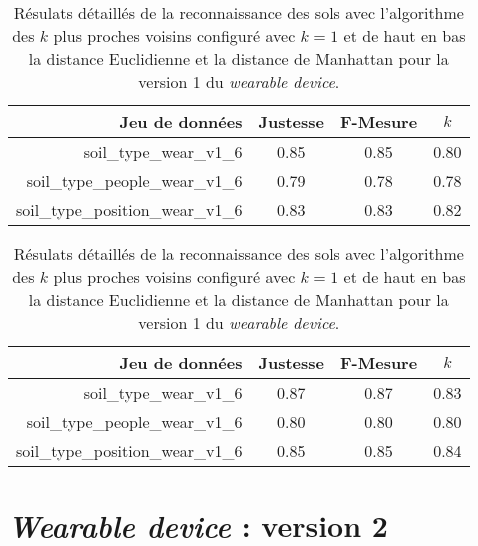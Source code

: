 \begin{table}[H]\renewcommand{\arraystretch}{0.5}
	\centering
	\caption{Résulats détaillés de la reconnaissance des sols avec l'algorithme des $k$ plus proches voisins configuré avec $k=1$ et de haut en bas la distance Euclidienne et la distance de Manhattan pour la version 1 du \textit{wearable device}.}
	\label{tab:rf-300-wear-v1}
	\begin{tabular}{@{}rccc@{}}
		\toprule
			\textbf{Jeu de données} & \textbf{Justesse} & \textbf{F-Mesure} & \textbf{$k$} \\
		\midrule
			soil\_type\_wear\_v1\_6 & 0.85 & 0.85 & 0.80 \\
			soil\_type\_people\_wear\_v1\_6 & 0.79 & 0.78 & 0.78 \\
			soil\_type\_position\_wear\_v1\_6 & 0.83 & 0.83 & 0.82 \\
	\end{tabular}
	\begin{tabular}{@{}rccc@{}}
		\toprule
			\textbf{Jeu de données} & \textbf{Justesse} & \textbf{F-Mesure} & \textbf{$k$} \\
		\midrule
			soil\_type\_wear\_v1\_6 & 0.87 & 0.87 & 0.83 \\
			soil\_type\_people\_wear\_v1\_6 & 0.80 & 0.80 & 0.80 \\
			soil\_type\_position\_wear\_v1\_6 & 0.85 & 0.85 & 0.84 \\
		\bottomrule
	\end{tabular}
\end{table}

\section{\textit{Wearable device} : version 2}

